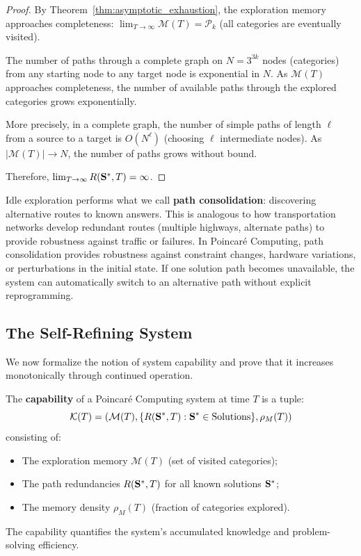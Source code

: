 \begin{proof}
By Theorem~\ref{thm:asymptotic_exhaustion}, the exploration memory approaches completeness: $\lim_{T \to \infty} \mathcal{M}(T) = \mathcal{P}_k$ (all categories are eventually visited).

The number of paths through a complete graph on $N = 3^{3k}$ nodes (categories) from any starting node to any target node is exponential in $N$. As $\mathcal{M}(T)$ approaches completeness, the number of available paths through the explored categories grows exponentially.

More precisely, in a complete graph, the number of simple paths of length $\ell$ from a source to a target is $O(N^\ell)$ (choosing $\ell$ intermediate nodes). As $|\mathcal{M}(T)| \to N$, the number of paths grows without bound.

Therefore, $\lim_{T \to \infty} R(\mathbf{S}^*, T) = \infty$.
\end{proof}

\begin{remark}
\label{rem:path_consolidation}
Idle exploration performs what we call \textbf{path consolidation}: discovering alternative routes to known answers. This is analogous to how transportation networks develop redundant routes (multiple highways, alternate paths) to provide robustness against traffic or failures. In Poincaré Computing, path consolidation provides robustness against constraint changes, hardware variations, or perturbations in the initial state. If one solution path becomes unavailable, the system can automatically switch to an alternative path without explicit reprogramming.
\end{remark}

\subsection{The Self-Refining System}

We now formalize the notion of system capability and prove that it increases monotonically through continued operation.

\begin{definition}
\label{def:system_capability}
The \textbf{capability} of a Poincaré Computing system at time $T$ is a tuple:
\begin{equation}
\mathcal{K}(T) = \left( \mathcal{M}(T), \{R(\mathbf{S}^*, T) : \mathbf{S}^* \in \text{Solutions}\}, \rho_M(T) \right)
\label{eq:system_capability}
\end{equation}
consisting of:
\begin{itemize}
    \item The exploration memory $\mathcal{M}(T)$ (set of visited categories);
    \item The path redundancies $R(\mathbf{S}^*, T)$ for all known solutions $\mathbf{S}^*$;
    \item The memory density $\rho_M(T)$ (fraction of categories explored).
\end{itemize}

The capability quantifies the system's accumulated knowledge and problem-solving efficiency.
\end{definition}

